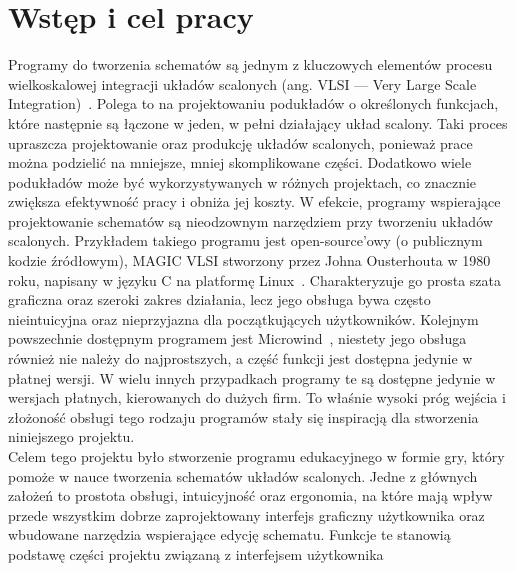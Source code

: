 \chapter{Wstęp i cel pracy}

Programy do tworzenia schematów są jednym z kluczowych elementów
procesu wielkoskalowej integracji układów scalonych (ang. VLSI — Very Large Scale Integration)~\cite{VLSI_insemi}.
Polega to na projektowaniu podukładów o określonych funkcjach,
które następnie są łączone w jeden, w pełni działający układ scalony.
Taki proces upraszcza projektowanie oraz produkcję układów scalonych, ponieważ prace można podzielić na mniejsze,
mniej skomplikowane części.
Dodatkowo wiele podukładów może być wykorzystywanych w różnych projektach,
co znacznie zwiększa efektywność pracy i obniża jej koszty.
W efekcie,
programy wspierające projektowanie schematów są nieodzownym narzędziem przy tworzeniu układów scalonych.
Przykładem takiego programu jest open-source'owy (o publicznym kodzie źródłowym),
MAGIC VLSI stworzony przez Johna Ousterhouta w 1980 roku,
napisany w języku C na platformę Linux~\cite{MAGIC_article}.
Charakteryzuje go prosta szata graficzna oraz szeroki zakres działania,
lecz jego obsługa bywa często nieintuicyjna oraz nieprzyjazna dla początkujących użytkowników.
Kolejnym powszechnie dostępnym programem jest Microwind~\cite{Microwind},
niestety jego obsługa również nie należy do najprostszych, a część funkcji jest dostępna jedynie w płatnej wersji.
W wielu innych przypadkach programy te są dostępne jedynie w wersjach płatnych, kierowanych do dużych firm.
To właśnie wysoki próg wejścia
i złożoność obsługi tego rodzaju programów stały się inspiracją dla stworzenia niniejszego projektu.\\
\indent Celem tego projektu było stworzenie
programu edukacyjnego w formie gry, który pomoże w nauce tworzenia schematów układów scalonych.
Jedne z głównych założeń to prostota obsługi, intuicyjność oraz ergonomia,
na które mają wpływ przede wszystkim dobrze zaprojektowany interfejs graficzny użytkownika
oraz wbudowane narzędzia wspierające edycję schematu.
Funkcje te stanowią podstawę części projektu związaną z interfejsem użytkownika
